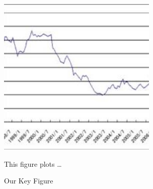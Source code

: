 \begin{figure}[H]
    \begin{center}
    \caption{Our Key Figure}
    \includegraphics[width=3.0in]{fig/dummy_figure.jpg}
    \end{center}
	\label{fig:mainsummary}
    \vspace{0.2cm}
    \begin{minipage}{0.95\textwidth} 
	{\footnotesize This figure plots \ldots
	\par
	}
	\end{minipage}
\end{figure}
